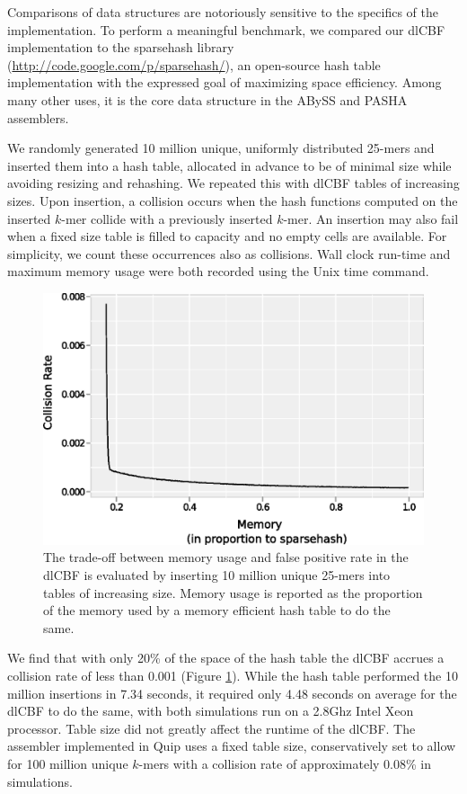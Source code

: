 \documentclass[a4,center,fleqn]{NAR}
\begin{document}
Comparisons of data structures are notoriously sensitive to the specifics of
the implementation. To perform a meaningful benchmark, we compared our dlCBF
implementation to the sparsehash library
(\url{http://code.google.com/p/sparsehash/}), an open-source hash table
implementation with the expressed goal of maximizing space efficiency. Among
many other uses, it is the core data structure in the ABySS
\citep{Simpson2011} and PASHA \citep{Liu2011} assemblers.

We randomly generated 10 million unique, uniformly distributed 25-mers and
inserted them into a hash table, allocated in advance to be of minimal size
while avoiding resizing and rehashing. We repeated this with dlCBF tables of
increasing sizes. Upon insertion, a collision occurs when the hash functions
computed on the inserted $k$-mer collide with a previously inserted $k$-mer.
An insertion may also fail when a fixed size table is filled to capacity and
no empty cells are available. For simplicity, we count these occurrences also
as collisions. Wall clock run-time and maximum memory usage were both recorded
using the Unix time command.

\begin{figure}[h]
\centerline{\includegraphics[width=\columnwidth]{dlcbf.eps}}
\caption{
The trade-off between memory usage and false positive rate in the dlCBF is
evaluated by inserting 10 million unique 25-mers into tables of increasing
size. Memory usage is reported as the proportion of the memory used by a
memory efficient hash table to do the same.
}
\label{fig:dlcbf_bench}
\end{figure}

We find that with only 20\% of the space of the hash table the dlCBF accrues a
collision rate of less than 0.001 (Figure \ref{fig:dlcbf_bench}). While
the hash table performed the 10 million insertions in 7.34 seconds, it
required only 4.48 seconds on average for the dlCBF to do the same, with both
simulations run on a 2.8Ghz Intel Xeon processor. Table size did not greatly
affect the runtime of the dlCBF. The assembler implemented in Quip uses a
fixed table size, conservatively set to allow for 100 million unique $k$-mers
with a collision rate of approximately 0.08\% in simulations.
\end{document}
